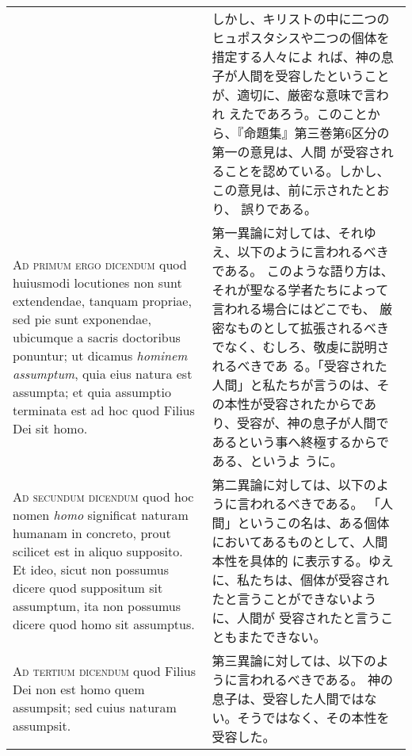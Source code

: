 \documentclass[10pt]{jsarticle} %
\begin{document}
\begin{longtable}{p{21em}p{21em}}
&


しかし、キリストの中に二つのヒュポスタシスや二つの個体を措定する人々によ
 れば、神の息子が人間を受容したということが、適切に、厳密な意味で言われ
 えたであろう。このことから、『命題集』第三巻第6区分の第一の意見は、人間
 が受容されることを認めている。しかし、この意見は、前に示されたとおり、
 誤りである。


\\



{\scshape Ad primum ergo dicendum} quod huiusmodi locutiones non sunt extendendae,
tanquam propriae, sed pie sunt exponendae, ubicumque a sacris doctoribus
ponuntur; ut dicamus {\itshape hominem assumptum}, quia eius natura est assumpta;
et quia assumptio terminata est ad hoc quod Filius Dei sit homo.


&

第一異論に対しては、それゆえ、以下のように言われるべきである。
このような語り方は、それが聖なる学者たちによって言われる場合にはどこでも、
 厳密なものとして拡張されるべきでなく、むしろ、敬虔に説明されるべきであ
 る。「受容された人間」と私たちが言うのは、その本性が受容されたからであ
 り、受容が、神の息子が人間であるという事へ終極するからである、というよ
 うに。

\\



{\scshape Ad secundum dicendum} quod hoc nomen {\itshape homo} significat naturam humanam in
concreto, prout scilicet est in aliquo supposito. Et ideo, sicut non
possumus dicere quod suppositum sit assumptum, ita non possumus dicere
quod homo sit assumptus.


&

第二異論に対しては、以下のように言われるべきである。
「人間」というこの名は、ある個体においてあるものとして、人間本性を具体的
 に表示する。ゆえに、私たちは、個体が受容されたと言うことができないように、人間が
 受容されたと言うこともまたできない。


\\



{\scshape Ad tertium dicendum} quod Filius Dei non est homo quem assumpsit; sed
cuius naturam assumpsit.


&

第三異論に対しては、以下のように言われるべきである。
神の息子は、受容した人間ではない。そうではなく、その本性を受容した。



\end{longtable}
\newpage
\end{document}
